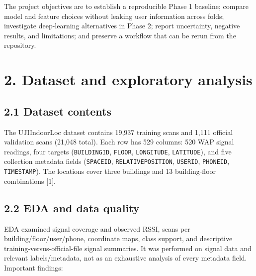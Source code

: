 \documentclass[
  10pt,
  a4paper,
]{article}
\begin{document}
The project objectives are to establish a reproducible Phase 1 baseline;
compare model and feature choices without leaking user information
across folds; investigate deep-learning alternatives in Phase 2; report
uncertainty, negative results, and limitations; and preserve a workflow
that can be rerun from the repository.

\section{2. Dataset and exploratory
analysis}\label{dataset-and-exploratory-analysis}

\subsection{2.1 Dataset contents}\label{dataset-contents}

The UJIIndoorLoc dataset contains 19,937 training scans and 1,111
official validation scans (21,048 total). Each row has 529 columns: 520
WAP signal readings, four targets (\texttt{BUILDINGID}, \texttt{FLOOR},
\texttt{LONGITUDE}, \texttt{LATITUDE}), and five collection metadata
fields (\texttt{SPACEID}, \texttt{RELATIVEPOSITION}, \texttt{USERID},
\texttt{PHONEID}, \texttt{TIMESTAMP}). The locations cover three
buildings and 13 building-floor combinations {[}1{]}.

\subsection{2.2 EDA and data quality}\label{eda-and-data-quality}

EDA examined signal coverage and observed RSSI, scans per
building/floor/user/phone, coordinate maps, class support, and
descriptive training-versus-official-file signal summaries. It was
performed on signal data and relevant labels/metadata, not as an
exhaustive analysis of every metadata field. Important findings:
\end{document}
